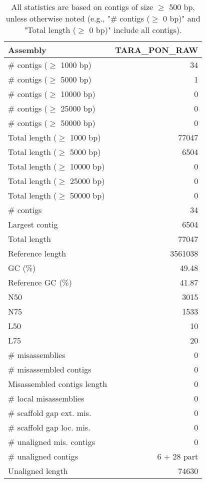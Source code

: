 \documentclass[12pt,a4paper]{article}
\begin{document}
\begin{table}[ht]
\begin{center}
\caption{All statistics are based on contigs of size $\geq$ 500 bp, unless otherwise noted (e.g., "\# contigs ($\geq$ 0 bp)" and "Total length ($\geq$ 0 bp)" include all contigs).}
\begin{tabular}{|l*{1}{|r}|}
\hline
Assembly & TARA\_PON\_RAW \\ \hline
\# contigs ($\geq$ 1000 bp) & 34 \\ \hline
\# contigs ($\geq$ 5000 bp) & 1 \\ \hline
\# contigs ($\geq$ 10000 bp) & 0 \\ \hline
\# contigs ($\geq$ 25000 bp) & 0 \\ \hline
\# contigs ($\geq$ 50000 bp) & 0 \\ \hline
Total length ($\geq$ 1000 bp) & 77047 \\ \hline
Total length ($\geq$ 5000 bp) & 6504 \\ \hline
Total length ($\geq$ 10000 bp) & 0 \\ \hline
Total length ($\geq$ 25000 bp) & 0 \\ \hline
Total length ($\geq$ 50000 bp) & 0 \\ \hline
\# contigs & 34 \\ \hline
Largest contig & 6504 \\ \hline
Total length & 77047 \\ \hline
Reference length & 3561038 \\ \hline
GC (\%) & 49.48 \\ \hline
Reference GC (\%) & 41.87 \\ \hline
N50 & 3015 \\ \hline
N75 & 1533 \\ \hline
L50 & 10 \\ \hline
L75 & 20 \\ \hline
\# misassemblies & 0 \\ \hline
\# misassembled contigs & 0 \\ \hline
Misassembled contigs length & 0 \\ \hline
\# local misassemblies & 0 \\ \hline
\# scaffold gap ext. mis. & 0 \\ \hline
\# scaffold gap loc. mis. & 0 \\ \hline
\# unaligned mis. contigs & 0 \\ \hline
\# unaligned contigs & 6 + 28 part \\ \hline
Unaligned length & 74630 \\ \hline

\end{tabular}
\end{center}
\end{table}
\end{document}
